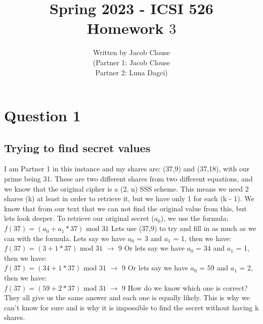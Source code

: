 \documentclass[10pt]{article}
\author{\vspace{0.2in}Written by Jacob Clouse\\  (Partner 1: Jacob Clouse\\ Partner 2: Luna Dagci)}
\title{Spring 2023 - ICSI 526\\Homework $3$}
\begin{document}
\maketitle
\tableofcontents
\vspace{0.2in}
\section{Question 1}
\subsection{Trying to find secret values}
\noindent I am Partner 1 in this instance and my shares are: (37,9) and  (37,18), with our prime being 31. These are two different shares from two different equations, and we know that the original cipher is a (2, n) SSS scheme. This means we need 2 shares (k) at least in order to retrieve it, but we have only 1 for each (k - 1). We know that from our text that we can not find the original value from this, but lets look deeper. To retrieve our original secret ($a_0$), we use the formula:\\ 

$f(37) = (a_0 + a_1*37) \textrm{ mod } 31$
\vspace{0.1in}
\newline
Lets use (37,9) to try and fill in as much as we can with the formula. Lets say we have $a_0$ = 3 and $a_1$ = 1, then we have:
\\ 

$f(37) = (3 + 1*37) \textrm{ mod } 31$
$\rightarrow$ 9
\vspace{0.1in}
\newline
Or lets say we have $a_0$ = 34 and $a_1$ = 1, then we have:
\\ 

$f(37) = (34 + 1*37) \textrm{ mod } 31$
$\rightarrow$ 9
\vspace{0.1in}
\newline
Or lets say we have $a_0$ = 59 and $a_1$ = 2, then we have:
\\ 

$f(37) = (59 + 2*37) \textrm{ mod } 31$
$\rightarrow$ 9
\vspace{0.1in}
\newline
How do we know which one is correct? They all give us the same answer and  each one is equally likely. This is why we can't know for sure and is why it is impossible to find the secret without having k shares.
\end{document}
